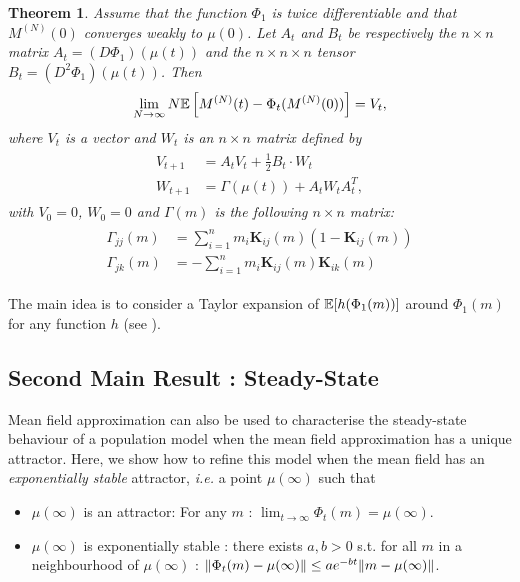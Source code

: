 \documentclass{sig-alternate-per}
\newtheorem{theorem}{Theorem}
\newcommand{\vr}[1]{\mathbf{#1}}
\newcommand\esp[1]{{\mathchoice{\besp{#1}}{\sesp{#1}}{\sesp{#1}}{\sesp{#1}}}}
\newcommand\besp[1]{\mathbb{E}\left[#1\right]}
\newcommand\sesp[1]{\mathbb{E}[#1]}
\newcommand\norm[1]{{\mathchoice{\bnorm{#1}}{\snorm{#1}}{\snorm{#1}}{\snorm{#1}}}}
\newcommand\bnorm[1]{\left\|#1\right\|}
\newcommand\snorm[1]{\|#1\|}
\newcommand{\aN}{^{(N)}}
\begin{document}
\begin{theorem}\label{theo:main}
  Assume that the function $\Phi_1$ is twice differentiable and that
  $M\aN(0)$ converges weakly to $\mu(0)$. Let $A_t$ and $B_t$ be
  respectively the $n \times n$ matrix $A_t = (D \Phi_1)(\mu(t))$ and
  the $n \times n \times n$ tensor $B_t = (D^2 \Phi_1)(\mu(t))$.  Then
  \begin{align*}
    \lim_{N\rightarrow \infty} N\esp{M\aN(t)- \Phi_t(M\aN(0))} =
    V_t,
  \end{align*}
  where $V_t$ is a vector and $W_t$ is an $n \times n$ matrix defined
  by
  \begin{align}
    \begin{array}{rl}
      V_{t+1} & = A_tV_t + \frac{1}{2}B_t \cdot W_t\\
      W_{t+1} & = \Gamma(\mu(t)) + A_t W_t A_t^T,
    \end{array}
                \label{eq:VW}
  \end{align}
  with $V_0=0$, $W_0 = 0$ and $\Gamma({m})$ is the following
  $n \times n$ matrix:
  \begin{align*}
    \begin{array}{rl}
      \Gamma_{jj}({m}) & =  \sum_{i=1}^n m_i \vr{K}_{ij}({m})(1-\vr{K}_{ij}({m}))\\
      \Gamma_{jk}({m}) & = -\sum_{i=1}^n m_i \vr{K}_{ij}({m})\vr{K}_{ik}({m})
    \end{array}
  \end{align*}
\end{theorem}
The main idea is to consider a Taylor expansion of
$\esp{h(\Phi_1(m))}$ around $\Phi_1(m)$ for any function $h$ (see
\cite{GaLaMa17}).


\subsection{Second Main Result : Steady-State}
\label{ssec:steady}

Mean field approximation can also be used to characterise the
steady-state behaviour of a population model when the mean field
approximation has a unique attractor. Here, we show how to refine this
model when the mean field has an \emph{exponentially stable}
attractor, \emph{i.e.} a point $\mu(\infty)$ such that
\begin{itemize}[leftmargin=*]
\item $\mu(\infty)$ is an attractor: For any $m$ :
  $\lim_{t\to\infty}\Phi_t(m)=\mu(\infty)$.
\item $\mu(\infty)$ is exponentially stable : there exists $a,b>0$
  s.t. for all $m$ in a neighbourhood of $\mu(\infty)$ :
  $\norm{\Phi_t(m)-\mu(\infty)}\le a e^{-bt}\norm{m-\mu(\infty)}$.
\end{itemize}
\end{document}

